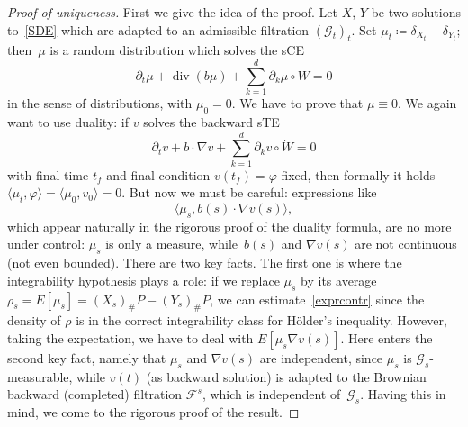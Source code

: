 \documentclass[a4paper,10pt]{article}
\newcommand\1{\mathbbm{1}}
\newcommand{\mc}{\mathcal}
\newcommand{\lan}{\langle}
\newcommand{\ran}{\rangle}
\DeclareMathOperator{\diverg}{div}
\numberwithin{equation}{section}
\begin{document}
\begin{proof}[Proof of uniqueness]
First we give the idea of the proof. Let $X$, $Y$ be two solutions to~\eqref{SDE} which are adapted to an admissible filtration $(\mc{G}_t)_t$. Set $\mu_t\coloneqq \delta_{X_t}-\delta_{Y_t}$; then~$\mu$ is a random distribution which solves the sCE
\begin{equation*}
\partial_t\mu+\diverg(b\mu)+\sum^d_{k=1}\partial_k\mu\circ\dot{W}=0
\end{equation*}
in the sense of distributions, with $\mu_0=0$. We have to prove that $\mu\equiv0$. We again want to use duality: if $v$ solves the backward sTE
\begin{equation*}
\partial_t v +b\cdot\nabla v +\sum^d_{k=1}\partial_kv\circ\dot{W} =0
\end{equation*}
with final time $t_f$ and final condition $v(t_f)=\varphi$ fixed, then formally it holds $\lan \mu_t,\varphi\ran= \lan \mu_0,v_0\ran =0$. But now we must be careful: expressions like
\begin{equation}
\lan \mu_s,b(s) \cdot\nabla v(s)\ran,\label{exprcontr}
\end{equation}
which appear naturally in the rigorous proof of the duality formula, are no more under control: $\mu_s$ is only a measure, while~$b(s)$ and $\nabla v(s)$ are not continuous (not even bounded). There are two key facts. The first one is where the integrability hypothesis plays a role: if we replace $\mu_s$ by its average $\rho_s=E[\mu_s]=(X_s)_\#P-(Y_s)_\#P$, we can estimate~\eqref{exprcontr} since the density of $\rho$ is in the correct integrability class for H\"older's inequality. However, taking the expectation, we have to deal with $E[\mu_s\nabla v(s)]$. Here enters the second key fact, namely that $\mu_s$ and $\nabla v(s)$ are independent, since $\mu_s$ is $\mc{G}_s$-measurable, while $v(t)$ (as backward solution) is adapted to the Brownian backward (completed) filtration $\mc{F}^{s}$, which is independent of~$\mc{G}_s$. Having this in mind, we come to the rigorous proof of the result.


\end{proof}
\end{document}

